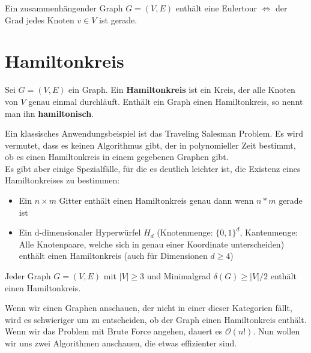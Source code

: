 \begin{satz}[Satz]
    Ein zusammenhängender Graph $G = (V,E)$ enthält eine Eulertour $\Leftrightarrow$ der Grad jedes Knoten
    $v \in V$ ist gerade.
\end{satz}

\section{Hamiltonkreis}
\begin{definition}
    Sei $G = (V,E)$ ein Graph. Ein \textbf{Hamiltonkreis} ist ein Kreis, der alle Knoten von $V$ genau einmal
    durchläuft. Enthält ein Graph einen Hamiltonkreis, so nennt man ihn \textbf{hamiltonisch}.
\end{definition}
\bigskip

Ein klassisches Anwendungsbeispiel ist das Traveling Salesman Problem. Es wird vermutet, dass es keinen 
Algorithmus gibt, der in polynomieller Zeit bestimmt, ob es einen Hamiltonkreis in einem gegebenen Graphen 
gibt. \\

Es gibt aber einige Spezialfälle, für die es deutlich leichter ist, die Existenz eines Hamiltonkreises 
zu bestimmen:

\begin{itemize}
    \item Ein $n \times m$ Gitter enthält einen Hamiltonkreis genau dann wenn $n * m$ gerade ist
    \item Ein d-dimensionaler Hyperwürfel $H_d$ (Knotenmenge: $\{0, 1\}^d$, Kantenmenge: Alle Knotenpaare, welche sich in genau einer Koordinate unterscheiden) enthält einen Hamiltonkreis (auch für Dimensionen $d \geq 4$)
\end{itemize}

\begin{satz}
    Jeder Graph $G = (V, E)$ mit $|V| \geq 3$ und Minimalgrad $\delta(G) \geq |V| / 2$ enthält
    einen Hamiltonkreis. 
\end{satz}
\bigskip

Wenn wir einen Graphen anschauen, der nicht in einer dieser Kategorien fällt, wird es schwieriger um zu 
entscheiden, ob der Graph einen Hamiltonkreis enthält. Wenn wir das Problem mit Brute Force angehen, dauert
es $\mathcal{O}(n!)$. Nun wollen wir uns zwei Algorithmen anschauen, die etwas effizienter sind.

\pagebreak

